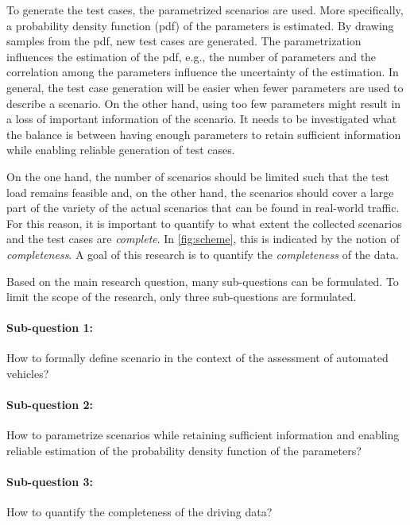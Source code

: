 To generate the test cases, the parametrized scenarios are used. More specifically, a probability density function (pdf) of the parameters is estimated. By drawing samples from the pdf, new test cases are generated. The parametrization influences the estimation of the pdf, e.g., the number of parameters and the correlation among the parameters influence the uncertainty of the estimation. In general, the test case generation will be easier when fewer parameters are used to describe a scenario. On the other hand, using too few parameters might result in a loss of important information of the scenario. It needs to be investigated what the balance is between having enough parameters to retain sufficient information while enabling reliable generation of test cases.

On the one hand, the number of scenarios should be limited such that the test load remains feasible and, on the other hand, the scenarios should cover a large part of the variety of the actual scenarios that can be found in real-world traffic. For this reason, it is important to quantify to what extent the collected scenarios and the test cases are \emph{complete}. In \cref{fig:scheme}, this is indicated by the notion of \emph{completeness}. A goal of this research is to quantify the \emph{completeness} of the data.

Based on the main research question, many sub-questions can be formulated. To limit the scope of the research, only three sub-questions are formulated. 

\begin{mdframed}[style=MyFrame]
	\paragraph{Sub-question 1:} How to formally define scenario in the context of the assessment of automated vehicles?
	
	\paragraph{Sub-question 2:} How to parametrize scenarios while retaining sufficient information and enabling reliable estimation of the probability density function of the parameters?
	
	\paragraph{Sub-question 3:} How to quantify the completeness of the driving data?
\end{mdframed}

